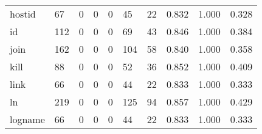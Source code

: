 \begin{longtable}{lp{1.3cm}p{1.3cm}p{1.3cm}p{1.3cm}p{1.3cm}p{1.3cm}p{1.3cm}p{1.3cm}p{1.3cm}}
hostid    &                     67 &                                             0 &                                            0 &                                           0 &                                           45 &                                         22 &                                0.832 &                                  1.000 &                                0.328 \\
id        &                    112 &                                             0 &                                            0 &                                           0 &                                           69 &                                         43 &                                0.846 &                                  1.000 &                                0.384 \\
join      &                    162 &                                             0 &                                            0 &                                           0 &                                          104 &                                         58 &                                0.840 &                                  1.000 &                                0.358 \\
kill      &                     88 &                                             0 &                                            0 &                                           0 &                                           52 &                                         36 &                                0.852 &                                  1.000 &                                0.409 \\
link      &                     66 &                                             0 &                                            0 &                                           0 &                                           44 &                                         22 &                                0.833 &                                  1.000 &                                0.333 \\
ln        &                    219 &                                             0 &                                            0 &                                           0 &                                          125 &                                         94 &                                0.857 &                                  1.000 &                                0.429 \\
logname   &                     66 &                                             0 &                                            0 &                                           0 &                                           44 &                                         22 &                                0.833 &                                  1.000 &                                0.333 \\

\end{longtable}
